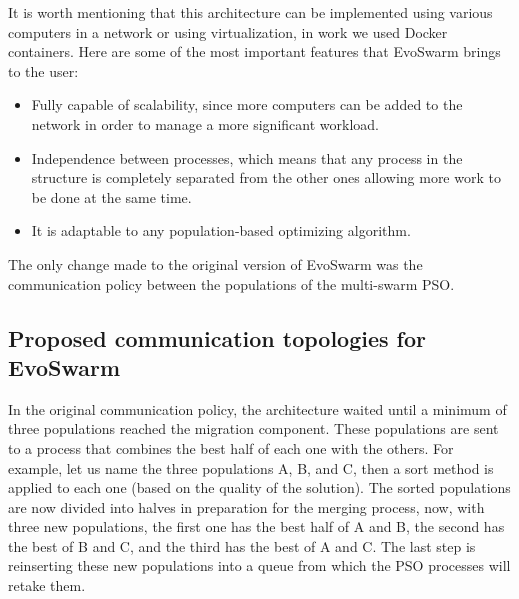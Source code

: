 \documentclass[runningheads]{llncs}
\begin{document}

It is worth mentioning that this architecture can be implemented using various
computers in a network or using virtualization, in work we used Docker containers. 
Here are some of the most important features that
EvoSwarm brings to the user:

\begin{itemize} 
  
  \item Fully capable of scalability, since more computers can be added to the
  network in order to manage a more significant workload.
    
    \item Independence between processes, which means that any process in the
    structure is completely separated from the other ones allowing more work to
    be done at the same time.
    
    \item It is adaptable to any population-based optimizing algorithm.
\end{itemize}

The only change made to the original version of EvoSwarm \cite{b18} was the
communication policy between the populations of the multi-swarm PSO.

\subsection{Proposed communication topologies for EvoSwarm} 

In the original communication policy, the architecture waited until a minimum of
three populations reached the migration component. These populations are sent to
a process that combines the best half of each one with the others. For example,
let us name the three populations A, B, and C, then a sort method is applied to
each one (based on the quality of the solution). The sorted populations are now
divided into halves in preparation for the merging process, now, with three new
populations, the first one has the best half of A and B, the second has the best
of B and C, and the third has the best of A and C. The last step is reinserting
these new populations into a queue from which the PSO processes will retake
them.
\end{document}
